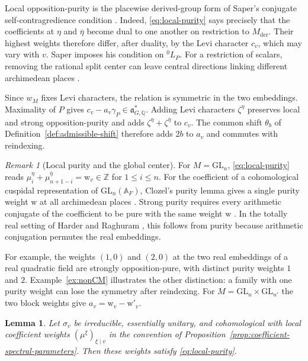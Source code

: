 \documentclass[12pt]{amsart}
\numberwithin{equation}{section}
\theoremstyle{plain}
\newtheorem{lemma}[theorem]{Lemma}
\theoremstyle{definition}
\theoremstyle{remark}
\newtheorem{remark}[theorem]{Remark}
\renewcommand{\bar}{\overline}
\newcommand{\GL}{\mathrm{GL}}
\begin{document}
Local opposition-purity is the placewise derived-group form of Saper's conjugate self-contragredience condition \cite[Def.~7.2(ii), Prop.~8.4]{SaperMicro}. Indeed, \eqref{eq:local-purity} says precisely that the coefficients at $\eta$ and $\bar\eta$ become dual to one another on restriction to $M_{\mathrm{der}}$. Their highest weights therefore differ, after duality, by the Levi character $c_v$, which may vary with $v$. Saper imposes his condition on ${}^0L_P$. For a restriction of scalars, removing the rational split center can leave central directions linking different archimedean places \cite[\S0.11.5, (0.2.1)]{SaperMicro}.

Since $w_M$ fixes Levi characters, the relation is symmetric in the two embeddings. Maximality of $P$ gives
$c_v-a_v\gamma_P\in\mathfrak a_{G,\mathbb Q}^*$. Adding Levi characters $\zeta^\eta$ preserves local and strong opposition-purity and adds $\zeta^\eta+\zeta^{\bar\eta}$ to $c_v$. The common shift $\theta_b$ of Definition~\ref{def:admissible-shift} therefore adds $2b$ to $a_v$ and commutes with reindexing.

\begin{remark}[Local purity and the global center]
\label{rem:purity-centers}
For $M=\mathrm{GL}_n$, \eqref{eq:local-purity} reads $\mu_i^\eta+\mu_{n+1-i}^{\bar\eta}=\mathrm{w}_v\in\mathbb Z$ for $1\le i\le n$. For the coefficient of a cohomological cuspidal representation of $\GL_n(\mathbb A_F)$, Clozel's purity lemma gives a single purity weight $\mathrm w$ at all archimedean places \cite[Lemme~4.9]{Clozel1990}. Strong purity requires every arithmetic conjugate of the coefficient to be pure with the same weight $\mathrm w$ \cite[\S2.3.1]{Raghuram2025}. In the totally real setting of Harder and Raghuram \cite{HarderRaghuram2020}, this follows from purity because arithmetic conjugation permutes the real embeddings.

For example, the weights $(1,0)$ and $(2,0)$ at the two real embeddings of a real quadratic field are strongly opposition-pure, with distinct purity weights $1$ and $2$. Example~\ref{ex:nonCM} illustrates the other distinction: a family with one purity weight can lose the symmetry after reindexing. For $M=\mathrm{GL}_n\times\mathrm{GL}_{n'}$ the two block weights give $a_v=\mathrm{w}_v-\mathrm{w}'_v$.
\end{remark}

\begin{lemma} \label{lem:essential-unitarity-purity}
Let $\sigma_v$ be irreducible, essentially unitary, and cohomological with local coefficient weights $(\mu^\xi)_{\xi\mid v}$ in the convention of Proposition~\ref{prop:coefficient-spectral-parameters}. Then these weights satisfy \eqref{eq:local-purity}.
\end{lemma}
\end{document}
